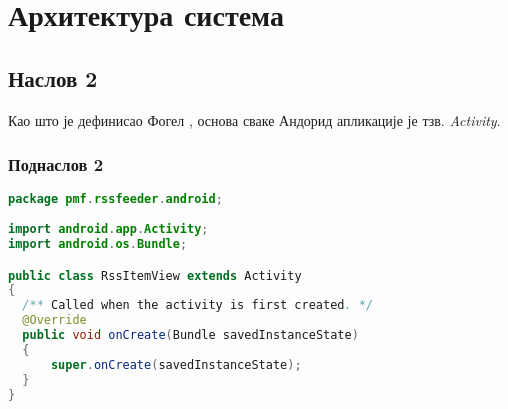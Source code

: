 \chapter{Архитектура система}

\section{Наслов 2}

Као што је дефинисао Фогел \cite{larsv}, основа сваке Андорид апликације је тзв. \textit{Activity}. 

\subsection{Поднаслов 2}

%
%
\begin{lstlisting}[language=Java,label=lst:rssfeeder,caption=RssItemView.java]
package pmf.rssfeeder.android;
 
import android.app.Activity;
import android.os.Bundle;

public class RssItemView extends Activity 
{
  /** Called when the activity is first created. */
  @Override
  public void onCreate(Bundle savedInstanceState) 
  {
      super.onCreate(savedInstanceState);
  }
}
\end{lstlisting}

